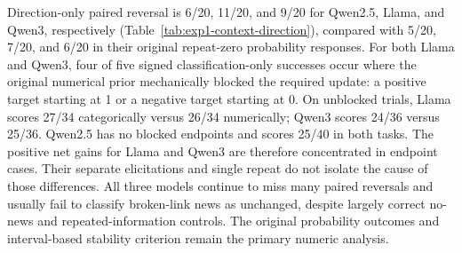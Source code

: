 \begin{center}
\begin{minipage}{\linewidth}
\centering
{}
\label{tab:exp1-context-direction}
\small

\end{minipage}
\end{center}

Direction-only paired reversal is 6/20, 11/20, and 9/20 for Qwen2.5, Llama,
and Qwen3, respectively (Table~\ref{tab:exp1-context-direction}), compared with
5/20, 7/20, and 6/20 in their original repeat-zero probability responses.
For both Llama and Qwen3, four of five signed classification-only successes
occur where the original numerical prior mechanically blocked the required
update: a positive target starting at 1 or a negative target starting at 0.
On unblocked trials, Llama scores 27/34 categorically versus 26/34 numerically;
Qwen3 scores 24/36 versus 25/36. Qwen2.5 has no blocked endpoints and scores
25/40 in both tasks. The positive net gains for Llama and Qwen3 are therefore
concentrated in endpoint cases. Their separate elicitations and single repeat
do not isolate the cause of those differences. All three models continue to
miss many paired reversals and usually fail to classify broken-link news as
unchanged, despite largely correct no-news and repeated-information controls.
The original probability outcomes and interval-based stability criterion remain
the primary numeric analysis.

